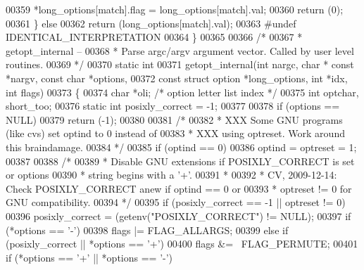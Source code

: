 \begin{DoxyCode}
{{{{{{{00359         *long\_options[match].flag = long\_options[match].val;
00360         \textcolor{keywordflow}{return} (0);
00361     \} \textcolor{keywordflow}{else}
00362         \textcolor{keywordflow}{return} (long\_options[match].val);
00363 \textcolor{preprocessor}{#undef IDENTICAL\_INTERPRETATION}
00364 \}
00365 
00366 \textcolor{comment}{/*}
00367 \textcolor{comment}{ * getopt\_internal --}
00368 \textcolor{comment}{ *  Parse argc/argv argument vector.  Called by user level routines.}
00369 \textcolor{comment}{ */}
00370 \textcolor{keyword}{static} \textcolor{keywordtype}{int}
00371 getopt_internal(\textcolor{keywordtype}{int} nargc, \textcolor{keywordtype}{char} * \textcolor{keyword}{const} *nargv, \textcolor{keyword}{const} \textcolor{keywordtype}{char} *options,
00372     \textcolor{keyword}{const} \textcolor{keyword}{struct} option *long\_options, \textcolor{keywordtype}{int} *idx, \textcolor{keywordtype}{int} flags)
00373 \{
00374     \textcolor{keywordtype}{char} *oli;              \textcolor{comment}{/* option letter list index */}
00375     \textcolor{keywordtype}{int} optchar, short\_too;
00376     \textcolor{keyword}{static} \textcolor{keywordtype}{int} posixly\_correct = -1;
00377 
00378     \textcolor{keywordflow}{if} (options == NULL)
00379         \textcolor{keywordflow}{return} (-1);
00380 
00381     \textcolor{comment}{/*}
00382 \textcolor{comment}{     * XXX Some GNU programs (like cvs) set optind to 0 instead of}
00383 \textcolor{comment}{     * XXX using optreset.  Work around this braindamage.}
00384 \textcolor{comment}{     */}
00385     \textcolor{keywordflow}{if} (optind == 0)
00386         optind = optreset = 1;
00387 
00388     \textcolor{comment}{/*}
00389 \textcolor{comment}{     * Disable GNU extensions if POSIXLY\_CORRECT is set or options}
00390 \textcolor{comment}{     * string begins with a '+'.}
00391 \textcolor{comment}{     *}
00392 \textcolor{comment}{     * CV, 2009-12-14: Check POSIXLY\_CORRECT anew if optind == 0 or}
00393 \textcolor{comment}{     *                 optreset != 0 for GNU compatibility.}
00394 \textcolor{comment}{     */}
00395     \textcolor{keywordflow}{if} (posixly\_correct == -1 || optreset != 0)
00396         posixly\_correct = (getenv(\textcolor{stringliteral}{"POSIXLY\_CORRECT"}) != NULL);
00397     \textcolor{keywordflow}{if} (*options == \textcolor{charliteral}{'-'})
00398         flags |= FLAG_ALLARGS;
00399     \textcolor{keywordflow}{else} \textcolor{keywordflow}{if} (posixly\_correct || *options == \textcolor{charliteral}{'+'})
00400         flags &= ~FLAG_PERMUTE;
00401     \textcolor{keywordflow}{if} (*options == \textcolor{charliteral}{'+'} || *options == \textcolor{charliteral}{'-'})
}}}}}}}
\end{DoxyCode}
